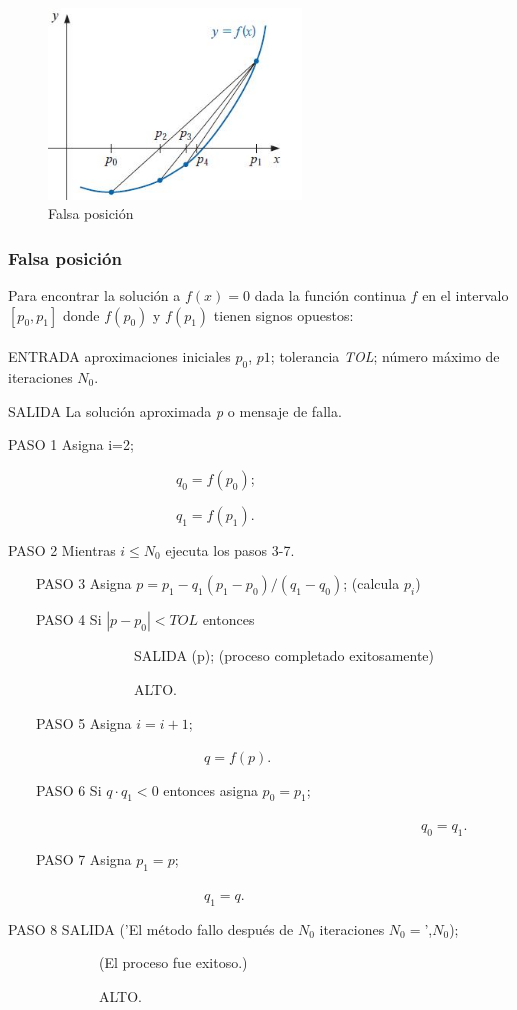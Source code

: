 \begin{figure}[h!]
\centering
  \includegraphics[width=0.6\textwidth]{Falsaposicion.JPG}
\caption{Falsa posición}
\label{tab:fig5}
\end{figure} 

\begin{tcolorbox}[colback=blue!15!]
\subsubsection*{Falsa posición}
Para encontrar la solución a $f(x)=0$ dada la función continua $f$ en el intervalo $[p_0,p_1]$ donde $f(p_0)$ y $f(p_1)$ tienen signos opuestos:
\\ \\
ENTRADA aproximaciones iniciales $p_0$, $p1$; tolerancia \textit{TOL}; número máximo de iteraciones $N_0$.

SALIDA La solución aproximada \textit{p} o mensaje de falla.

PASO 1 Asigna i=2;

\ \ \ \ \ \ \ \ \ \ \ \ \ \ \ \ \ \ \ \ \ \ \ \ $q_0=f(p_0)$;

\ \ \ \ \ \ \ \ \ \ \ \ \ \ \ \ \ \ \ \ \ \ \ \ $q_1=f(p_1)$.

PASO 2 Mientras $i\leq N_0$ ejecuta los pasos 3-7.

\ \ \ \  PASO 3 Asigna $p=p_1 -q_1(p_1-p_0)/(q_1-q_0) $; (calcula $p_i$)

\ \ \ \  PASO 4 Si $|p-p_0|<TOL$ entonces

\ \ \ \ \ \ \ \ \ \ \ \ \ \ \ \ \ \ SALIDA (p); (proceso completado exitosamente)

\ \ \ \ \ \ \ \ \ \ \ \ \ \ \ \ \ \ ALTO.

\ \ \ \   PASO 5 Asigna $i=i+1$;

\ \ \ \ \ \ \ \ \ \ \ \ \ \ \ \ \ \ \ \ \ \ \ \ \ \ \ \ $q=f(p)$.
    
\ \ \ \   PASO 6 Si $q\cdot q_1<0$ entonces asigna $p_0=p_1$; 

\ \ \ \ \ \ \ \ \ \ \ \ \ \ \ \ \ \ \ \ \ \ \ \ \ \ \ \ \ \ \ \ \ \ \ \ \ \ \ \ \ \ \ \ \ \ \ \ \ \ \ \ \ \ \ \ \ \ \ $q_0=q_1$.

\ \ \ \   PASO 7 Asigna $p_1=p$;

\ \ \ \ \ \ \ \ \ \ \ \ \ \ \ \ \ \ \ \ \ \ \ \ \ \ \ \ $q_1=q$.

PASO 8 SALIDA ('El método fallo después de $N_0$ iteraciones $N_0=$',$N_0$);

\ \ \ \ \ \ \ \ \ \ \ \ \ (El proceso fue exitoso.)

\ \ \ \ \ \ \ \ \ \ \ \ \ ALTO.


\end{tcolorbox}

